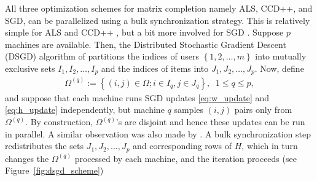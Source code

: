 \documentclass{vldb}
\newcommand{\cbr}[1]{\left\{#1\right\}}
\begin{document}
All three optimization schemes for matrix completion namely ALS, CCD++,
and SGD, can be parallelized using a bulk synchronization strategy. This
is relatively simple for ALS \citep{ZhoWilSchPan08} and CCD++
\citep{YuHsiSiDhi12}, but a bit more involved for SGD
\citep{GemNijHaaSis11,RecRe13}.  Suppose $p$ machines are available.
Then, the Distributed Stochastic Gradient Descent (DSGD) algorithm of
\citet{GemNijHaaSis11} partitions the indices of users
$\cbr{1,2,\ldots,m}$ into mutually exclusive sets $I_1, I_2, \ldots,
I_p$ and the indices of items into $J_1, J_2, \ldots, J_p$.  Now, define
\begin{align*}
  \Omega^{(q)} := \cbr{ (i,j) \in \Omega; i \in I_q, j \in J_q }, 
  \;\; 1 \leq q \leq p,
\end{align*}
and suppose that each machine runs SGD updates \eqref{eq:w_update} and
\eqref{eq:h_update} independently, but machine $q$ samples $(i,j)$ pairs
only from $\Omega^{(q)}$. By construction, $\Omega^{(q)}$'s are disjoint
and hence these updates can be run in parallel. A similar observation
was also made by \citet{RecRe13}. A bulk synchronization step
redistributes the sets $J_1, J_2, \ldots,J_p$ and corresponding rows of
$H$, which in turn changes the $\Omega^{(q)}$ processed by each machine,
and the iteration proceeds (see Figure~\ref{fig:dsgd_scheme})
\end{document}
